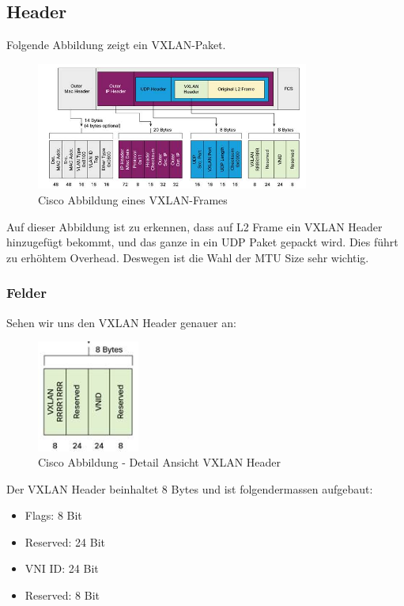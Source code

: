 \documentclass[a4,12pt]{scrartcl}
\begin{document}
\subsection{Header}
Folgende Abbildung zeigt ein VXLAN-Paket. 
\begin{figure} [H]
	\begin{center}
	\includegraphics[width=0.80\textwidth]{./pictures/vxlan_header.png}
	\caption{Cisco Abbildung eines VXLAN-Frames}
	\label{x}
	\end{center}
\end{figure}
\noindent Auf dieser Abbildung ist zu erkennen, dass auf L2 Frame ein VXLAN Header hinzugefügt bekommt, und das ganze in ein UDP Paket gepackt wird. Dies führt zu erhöhtem Overhead. Deswegen ist die Wahl der MTU Size sehr wichtig. 

\subsubsection{Felder}
Sehen wir uns den VXLAN Header genauer an: 
\begin{figure} [H]
	\begin{center}
	\includegraphics[width=0.30\textwidth]{./pictures/vxlan_header_detail.png}
	\caption{Cisco Abbildung - Detail Ansicht VXLAN Header}
	\label{x}
	\end{center}
\end{figure}

Der VXLAN Header beinhaltet 8 Bytes und ist folgendermassen aufgebaut: 
\begin{itemize}
\item Flags: 8 Bit 
\item Reserved: 24 Bit 
\item VNI ID: 24 Bit 
\item Reserved: 8 Bit 
\end{itemize}
\end{document}
